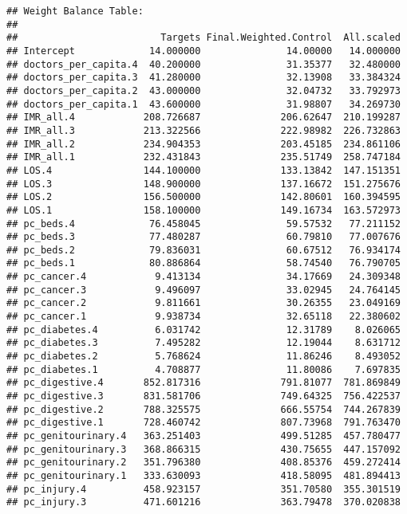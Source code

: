 \documentclass[
]{article}
\begin{document}
\begin{verbatim}
## Weight Balance Table: 
## 
##                         Targets Final.Weighted.Control  All.scaled
## Intercept             14.000000               14.00000   14.000000
## doctors_per_capita.4  40.200000               31.35377   32.480000
## doctors_per_capita.3  41.280000               32.13908   33.384324
## doctors_per_capita.2  43.000000               32.04732   33.792973
## doctors_per_capita.1  43.600000               31.98807   34.269730
## IMR_all.4            208.726687              206.62647  210.199287
## IMR_all.3            213.322566              222.98982  226.732863
## IMR_all.2            234.904353              203.45185  234.861106
## IMR_all.1            232.431843              235.51749  258.747184
## LOS.4                144.100000              133.13842  147.151351
## LOS.3                148.900000              137.16672  151.275676
## LOS.2                156.500000              142.80601  160.394595
## LOS.1                158.100000              149.16734  163.572973
## pc_beds.4             76.458045               59.57532   77.211152
## pc_beds.3             77.480287               60.79810   77.007676
## pc_beds.2             79.836031               60.67512   76.934174
## pc_beds.1             80.886864               58.74540   76.790705
## pc_cancer.4            9.413134               34.17669   24.309348
## pc_cancer.3            9.496097               33.02945   24.764145
## pc_cancer.2            9.811661               30.26355   23.049169
## pc_cancer.1            9.938734               32.65118   22.380602
## pc_diabetes.4          6.031742               12.31789    8.026065
## pc_diabetes.3          7.495282               12.19044    8.631712
## pc_diabetes.2          5.768624               11.86246    8.493052
## pc_diabetes.1          4.708877               11.80086    7.697835
## pc_digestive.4       852.817316              791.81077  781.869849
## pc_digestive.3       831.581706              749.64325  756.422537
## pc_digestive.2       788.325575              666.55754  744.267839
## pc_digestive.1       728.460742              807.73968  791.763470
## pc_genitourinary.4   363.251403              499.51285  457.780477
## pc_genitourinary.3   368.866315              430.75655  447.157092
## pc_genitourinary.2   351.796380              408.85376  459.272414
## pc_genitourinary.1   333.630093              418.58095  481.894413
## pc_injury.4          458.923157              351.70580  355.301519
## pc_injury.3          471.601216              363.79478  370.020838

\end{verbatim}
\end{document}
